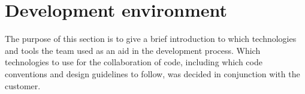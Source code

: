 \newpage
\section{Development environment}
The purpose of this section is to give a brief introduction to which technologies and tools the team used as an aid in the development process. Which technologies to use for the collaboration of code, including which code conventions and design guidelines to follow, was decided in conjunction with the customer.








